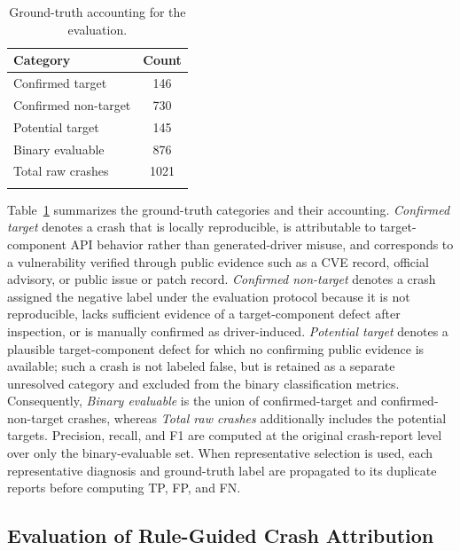 \documentclass[pdflatex,sn-basic]{sn-jnl}%
\renewcommand{\arraystretch}{1.16}%
\theoremstyle{thmstyleone}%
\theoremstyle{thmstyletwo}%
\theoremstyle{thmstylethree}%
\begin{document}
\FloatBarrier
\begin{table}[!htbp]
\caption{Ground-truth accounting for the evaluation.}
\label{tab:ground-truth-accounting}
\centering
\scriptsize
\setlength{\tabcolsep}{4pt}
\renewcommand{\arraystretch}{1.10}
\begin{tabular*}{\linewidth}{@{\extracolsep{\fill}}lc}
\toprule
\textbf{Category} & \textbf{Count} \\
\midrule
Confirmed target & 146 \\
Confirmed non-target & 730 \\
Potential target & 145 \\
Binary evaluable & 876 \\
Total raw crashes & 1021 \\
\botrule
\end{tabular*}
\end{table}

Table~\ref{tab:ground-truth-accounting} summarizes the ground-truth categories and their accounting. \emph{Confirmed target} denotes a crash that is locally reproducible, is attributable to target-component API behavior rather than generated-driver misuse, and corresponds to a vulnerability verified through public evidence such as a CVE record, official advisory, or public issue or patch record. \emph{Confirmed non-target} denotes a crash assigned the negative label under the evaluation protocol because it is not reproducible, lacks sufficient evidence of a target-component defect after inspection, or is manually confirmed as driver-induced. \emph{Potential target} denotes a plausible target-component defect for which no confirming public evidence is available; such a crash is not labeled false, but is retained as a separate unresolved category and excluded from the binary classification metrics. Consequently, \emph{Binary evaluable} is the union of confirmed-target and confirmed-non-target crashes, whereas \emph{Total raw crashes} additionally includes the potential targets. Precision, recall, and F1 are computed at the original crash-report level over only the binary-evaluable set. When representative selection is used, each representative diagnosis and ground-truth label are propagated to its duplicate reports before computing TP, FP, and FN.

\FloatBarrier
\subsection{Evaluation of Rule-Guided Crash Attribution}
\end{document}
